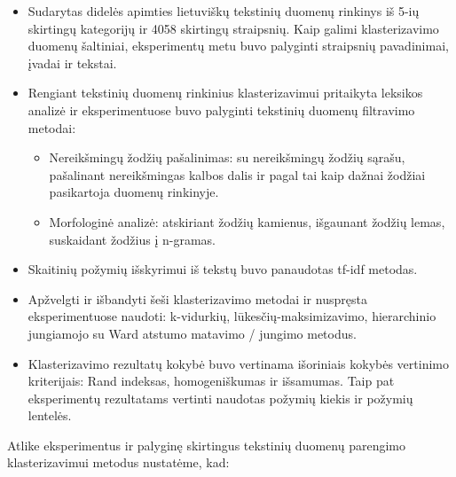 \documentclass{VUMIFInfBakalaurinis}
\providecommand{\tightlist}{%
	  \setlength{\itemsep}{0pt}\setlength{\parskip}{0pt}}
\begin{document}
\begin{itemize}
\tightlist
\item
  Sudarytas didelės apimties lietuviškų tekstinių duomenų rinkinys iš
  5-ių skirtingų kategorijų ir 4058 skirtingų straipsnių. Kaip galimi
  klasterizavimo duomenų šaltiniai, eksperimentų metu buvo palyginti
  straipsnių pavadinimai, įvadai ir tekstai.
\item
  Rengiant tekstinių duomenų rinkinius klasterizavimui pritaikyta
  leksikos analizė ir eksperimentuose buvo palyginti tekstinių duomenų
  filtravimo metodai:

  \begin{itemize}
  \tightlist
  \item
    Nereikšmingų žodžių pašalinimas: su nereikšmingų žodžių sąrašu,
    pašalinant nereikšmingas kalbos dalis ir pagal tai kaip dažnai žodžiai pasikartoja
    duomenų rinkinyje.
  \item
    Morfologinė analizė: atskiriant žodžių kamienus, išgaunant žodžių
    lemas, suskaidant žodžius į n-gramas.
  \end{itemize}
\item
  Skaitinių požymių išskyrimui iš tekstų buvo panaudotas tf-idf metodas.
\item
  Apžvelgti ir išbandyti šeši klasterizavimo metodai ir nuspręsta
  eksperimentuose naudoti: k-vidurkių, lūkesčių-maksimizavimo,
  hierarchinio jungiamojo su Ward atstumo matavimo / jungimo metodus.
\item
  Klasterizavimo rezultatų kokybė buvo vertinama išoriniais kokybės vertinimo kriterijais: Rand
  indeksas, homogeniškumas ir išsamumas. Taip pat eksperimentų rezultatams
  vertinti naudotas požymių kiekis ir požymių lentelės.
\end{itemize}

Atlike eksperimentus ir palyginę skirtingus tekstinių duomenų parengimo 
klasterizavimui metodus nustatėme, kad:
\end{document}
